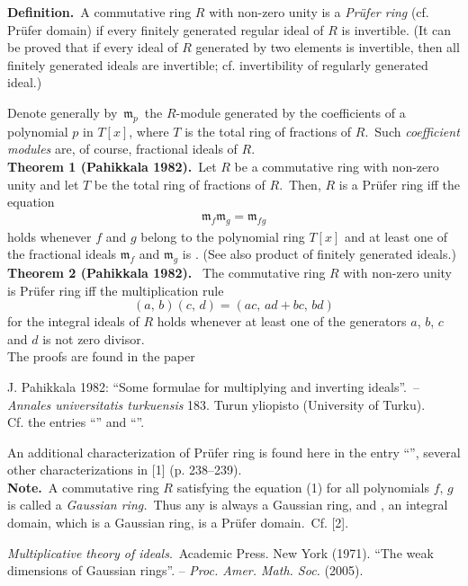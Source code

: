 \documentclass[12pt]{article}
\theoremstyle{definition}
\begin{document}
\textbf{Definition.}\,  A commutative ring $R$ with non-zero unity is a \emph{Pr\"ufer ring} (cf. Pr\"ufer domain) if every finitely generated regular ideal of $R$ is invertible. (It can be proved that if every  ideal of $R$ generated by two elements is invertible, then all finitely generated  ideals are invertible; cf. invertibility of regularly generated ideal.)

Denote generally by\, $\mathfrak{m}_p$\, the $R$-module generated by the coefficients of a polynomial $p$ in $T[x]$, where $T$ is the total ring of fractions of $R$.\, Such {\em coefficient modules} are, of course, fractional ideals of $R$.\\

\textbf{Theorem 1 (Pahikkala 1982).}\, Let $R$ be a commutative ring with non-zero unity and let $T$ be the total ring of fractions of $R$.\, Then, $R$ is a Pr\"ufer ring iff the equation
\begin{align}
        \mathfrak{m}_f\mathfrak{m}_g = \mathfrak{m}_{fg}
\end{align}
holds whenever $f$ and $g$ belong to the polynomial ring $T[x]$ and at least one of the fractional ideals $\mathfrak{m}_f$ and $\mathfrak{m}_g$ is . (See also product of finitely generated ideals.)\\


\textbf{Theorem 2 (Pahikkala 1982).} \, The commutative ring $R$ with non-zero unity is Pr\"ufer ring iff the multiplication rule
                $$(a,\,b)(c,\,d) = (ac,\,ad+bc,\,bd)$$
for the integral ideals of $R$ holds whenever at least one of the generators $a$, $b$, $c$ and $d$ is not zero divisor.\\


The proofs are found in the paper

J. Pahikkala 1982: ``Some formulae for multiplying and inverting ideals''.\, -- {\em Annales universitatis turkuensis} 183. Turun yliopisto (University of Turku).\\

Cf. the entries ``'' and ``''.

An additional characterization of Pr\"ufer ring is found here in the entry ``'', several other characterizations in [1] (p. 238--239).\\

\textbf{Note.}\, A commutative ring $R$ satisfying the equation (1) for all polynomials $f,\,g$ is called a {\em Gaussian ring.}\, Thus any  is always a Gaussian ring, and , an integral domain, which is a Gaussian ring, is a Pr\"ufer domain.\, Cf. [2].

\begin{thebibliography}{9}
 {\em Multiplicative theory of ideals}.\, Academic Press. New York (1971).
 ``The weak dimensions of Gaussian rings''. -- {\em Proc. Amer. Math. Soc.} (2005).
\end{thebibliography}
\end{document}

